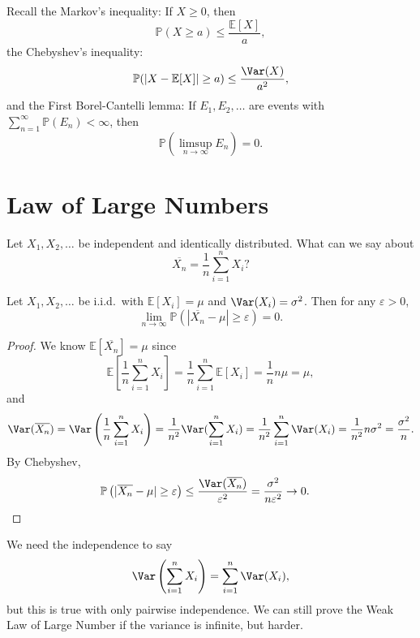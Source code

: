 Recall the Markov's inequality: If \(X \ge 0\), then 
\[
    \mathbb{P} (X \ge a) \le \frac{\mathbb{E} [X]}{a},
\] 
the Chebyshev's inequality:
\[
    \mathbb{P} (\vert X - \mathbb{E} [X] \vert \ge a) \le \frac{\Var(X)}{a^2},
\]
and the First Borel-Cantelli lemma: If \(E_1, E_2, \dots \) are events with \(\sum_{n=1}^{\infty} \mathbb{P} (E_n) < \infty \), then 
\[
    \mathbb{P} \left( \limsup_{n \to \infty} E_n  \right) = 0. 
\]  
\section{Law of Large Numbers}
Let \(X_1, X_2, \dots \) be independent and identically distributed. What can we say about 
\[
    \overline{X_n} = \frac{1}{n} \sum_{i=1}^n X_i ? 
\] 

\begin{theorem}
    Let \(X_1, X_2, \dots \) be i.i.d.\ with \(\mathbb{E} [X_i] = \mu\) and \(\Var(X_i) = \sigma ^2\). Then for any \(\varepsilon > 0\),
    \[
        \lim_{n \to \infty} \mathbb{P} \left( \left\vert \overline{X_n} - \mu  \right\vert \ge \varepsilon \right) = 0.  
    \]    
\end{theorem}

\begin{proof}
    We know \(\mathbb{E} [\overline{X_n}] = \mu\) since 
    \[
        \mathbb{E} \left[ \frac{1}{n} \sum_{i=1}^n X_i  \right] = \frac{1}{n} \sum_{i=1}^n \mathbb{E} [X_i] = \frac{1}{n} n \mu = \mu,  
    \] 
    and 
    \[
        \Var(\overline{X_n}) = \Var\left( \frac{1}{n} \sum_{i=1}^n X_i  \right) = \frac{1}{n^2} \Var(\sum_{i=1}^n X_i) = \frac{1}{n^2} \sum_{i=1}^n \Var(X_i) = \frac{1}{n^2} n \sigma ^2 = \frac{\sigma ^2}{n}.  
    \]
    By Chebyshev,
    \begin{align*}
        \mathbb{P} \left( \vert \overline{X_n} - \mu  \vert \ge \varepsilon \right) &\le \frac{\Var(\overline{X_n} )}{\varepsilon ^2} = \frac{\sigma ^2}{n \varepsilon^2} \to 0. 
    \end{align*}
\end{proof}

\begin{remark}
    We need the independence to say 
    \[
        \Var \left( \sum_{i=1}^n X_i  \right) = \sum_{i=1}^n \Var(X_i),  
    \]
    but this is true with only pairwise independence. We can still prove the Weak Law of Large Number if the variance is infinite, but harder.
\end{remark}


